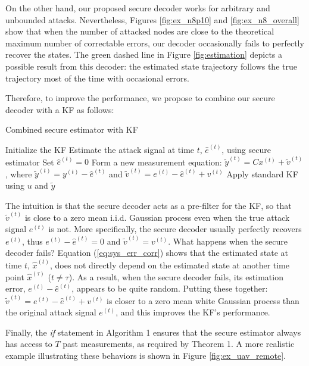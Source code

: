 \documentclass[journal]{IEEEtran}
\begin{document}
On the other hand, our proposed secure decoder works for arbitrary and unbounded attacks.
Nevertheless, Figures \ref{fig:ex_n8p10} and \ref{fig:ex_n8_overall} show that when the number of attacked nodes are close to the theoretical maximum number of correctable errors, our decoder occasionally fails to perfectly recover the states.
The green dashed line in Figure \ref{fig:estimation} depicts a possible result from this decoder: the estimated state trajectory follows the true trajectory most of the time with occasional errors.

Therefore, to improve the performance, we propose to combine our secure decoder with a KF as follows:
\begin{algorithm}
\caption{Combined secure estimator with KF}
\label{al:se_kf}
\begin{algorithmic}[1]
\State Initialize the KF
		\State Estimate the attack signal at time $t$, $\hat e^{(t)}$, using secure estimator
	\Else
		\State Set $\hat e^{(t)} = 0$
	\EndIf
	\State Form a new measurement equation: $\tilde y^{(t)} =  C x^{(t)} + \tilde v^{(t)}$, where $\tilde y^{(t)} = y^{(t)} - \hat e^{(t)}$ and $ \tilde v^{(t)} = e ^{(t)} - \hat e^{(t)} + v^{(t)}$
	\State Apply standard KF using $u$ and $\tilde y$ 
\EndFor
\end{algorithmic}
\end{algorithm}

\noindent
The intuition is that the secure decoder acts as a pre-filter for the KF, so that $\tilde v^{(t)}$ is close to a zero mean i.i.d. Gaussian process even when the true attack signal $e^{(t)}$ is not. More specifically, the secure decoder usually perfectly recovers $e^{(t)}$, thus $e^{(t)} - \hat e^{(t)} = 0$ and $\tilde v^{(t)} = v^{(t)}$. What happens when the secure decoder fails? Equation (\ref{eq:sys_err_corr}) shows that the estimated state at time $t$, $\hat x^{(t)}$, does not directly depend on the estimated state at another time point $\hat x^{(\tau)}$ ($t \neq \tau$). As a result, when the secure decoder fails, its estimation error, $e^{(t)} - \hat e^{(t)}$, appears to be quite random. Putting these together: $\tilde v^{(t)} = e^{(t)} - \hat e^{(t)} + v^{(t)}$ is closer to a zero mean white Gaussian process than the original attack signal $e^{(t)}$, and this improves the KF's performance. 

Finally, the \textit{if} statement in Algorithm 1 ensures that the secure estimator always has access to $T$ past measurements, as required by Theorem 1.
A more realistic example illustrating these behaviors is shown in Figure \ref{fig:ex_uav_remote}.
\end{document}
